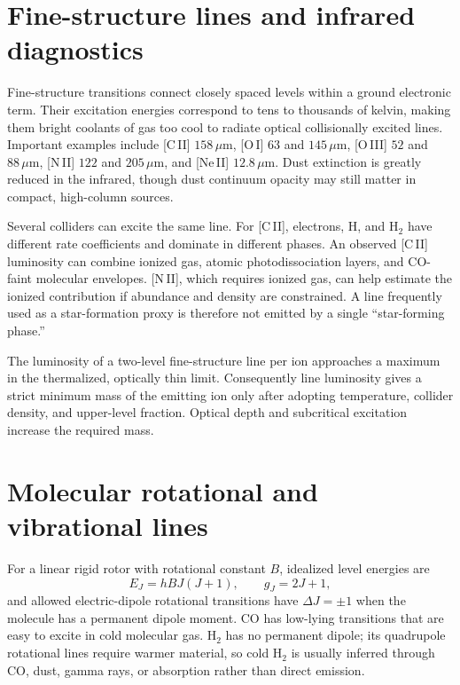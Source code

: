 \section{Fine-structure lines and infrared diagnostics}

Fine-structure transitions connect closely spaced levels within a ground electronic
term.  Their excitation energies correspond to tens to thousands of kelvin, making
them bright coolants of gas too cool to radiate optical collisionally excited lines.
Important examples include [C\,II] $158\,\mu$m, [O\,I] $63$ and $145\,\mu$m,
[O\,III] $52$ and $88\,\mu$m, [N\,II] $122$ and $205\,\mu$m, and [Ne\,II]
$12.8\,\mu$m.  Dust extinction is greatly reduced in the infrared, though dust
continuum opacity may still matter in compact, high-column sources.

Several colliders can excite the same line.  For [C\,II], electrons, H, and
H$_2$ have different rate coefficients and dominate in different phases.  An
observed [C\,II] luminosity can combine ionized gas, atomic photodissociation layers,
and CO-faint molecular envelopes.  [N\,II], which requires ionized gas, can help
estimate the ionized contribution if abundance and density are constrained.  A line
frequently used as a star-formation proxy is therefore not emitted by a single
``star-forming phase.''

The luminosity of a two-level fine-structure line per ion approaches a maximum in the
thermalized, optically thin limit.  Consequently line luminosity gives a strict
minimum mass of the emitting ion only after adopting temperature, collider density,
and upper-level fraction.  Optical depth and subcritical excitation increase the
required mass.

\section{Molecular rotational and vibrational lines}

For a linear rigid rotor with rotational constant $B$, idealized level energies are
\begin{equation}
 E_J=hBJ(J+1),\qquad g_J=2J+1,
 \label{eq:rigid-rotor}
\end{equation}
and allowed electric-dipole rotational transitions have $\Delta J=\pm1$ when the
molecule has a permanent dipole moment.  CO has low-lying transitions that are easy
to excite in cold molecular gas.  H$_2$ has no permanent dipole; its quadrupole
rotational lines require warmer material, so cold H$_2$ is usually inferred through
CO, dust, gamma rays, or absorption rather than direct emission.

